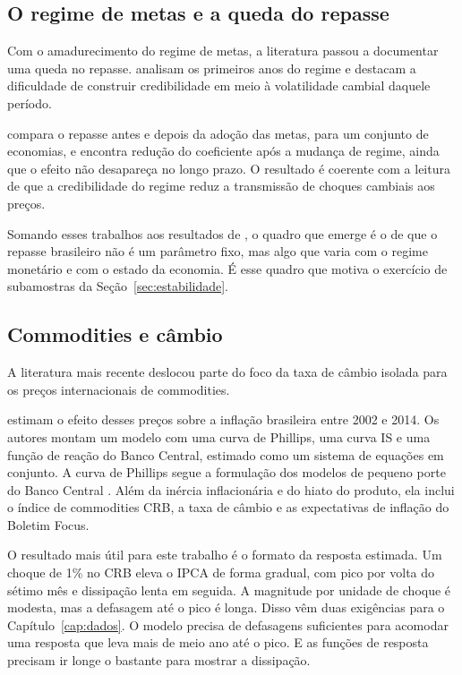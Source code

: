 \documentclass[12pt,openright,oneside,a4paper,portuguese,brazil]{abntex2}
\begin{document}
\subsection{O regime de metas e a queda do repasse}
\label{sec:metas}

Com o amadurecimento do regime de metas, a literatura passou a documentar uma
queda no repasse.  analisam os primeiros anos do regime
e destacam a dificuldade de construir credibilidade em meio à volatilidade
cambial daquele período.

 compara o repasse antes e depois da adoção das
metas, para um conjunto de economias, e encontra redução do coeficiente após a
mudança de regime, ainda que o efeito não desapareça no longo prazo. O resultado
é coerente com a leitura de que a credibilidade do regime reduz a transmissão de
choques cambiais aos preços.

Somando esses trabalhos aos resultados de , o
quadro que emerge é o de que o repasse brasileiro não é um parâmetro fixo, mas
algo que varia com o regime monetário e com o estado da economia. É esse quadro
que motiva o exercício de subamostras da Seção~\ref{sec:estabilidade}.

\subsection{Commodities e câmbio}
\label{sec:recentes}

A literatura mais recente deslocou parte do foco da taxa de câmbio isolada para
os preços internacionais de commodities.

 estimam o efeito desses preços sobre a inflação
brasileira entre 2002 e 2014. Os autores montam um modelo com uma curva de
Phillips, uma curva IS e uma função de reação do Banco Central, estimado como um
sistema de equações em conjunto. A curva de Phillips segue a formulação dos modelos de pequeno porte do Banco
Central \cite{bogdanski2000}. Além da inércia inflacionária e do hiato do
produto, ela inclui o índice de commodities CRB, a taxa de câmbio e as
expectativas de inflação do Boletim Focus.

O resultado mais útil para este trabalho é o formato da resposta estimada. Um
choque de 1\% no CRB eleva o IPCA de forma gradual, com pico por volta do sétimo
mês e dissipação lenta em seguida. A magnitude por unidade de choque é modesta,
mas a defasagem até o pico é longa. Disso vêm duas exigências para o Capítulo~\ref{cap:dados}. O modelo precisa de
defasagens suficientes para acomodar uma resposta que leva mais de meio ano
até o pico. E as funções de resposta precisam ir longe o bastante para mostrar
a dissipação.
\end{document}
